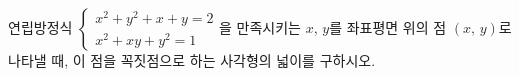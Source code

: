 연립방정식 $\begin{cases} x^2+y^2+x+y=2 \\ x^2+xy+y^2=1 \end{cases}$을 만족시키는 $x$, $y$를 좌표평면 위의 점 $(x,\,y)$로 나타낼 때, 이 점을 꼭짓점으로 하는 사각형의 넓이를 구하시오.
